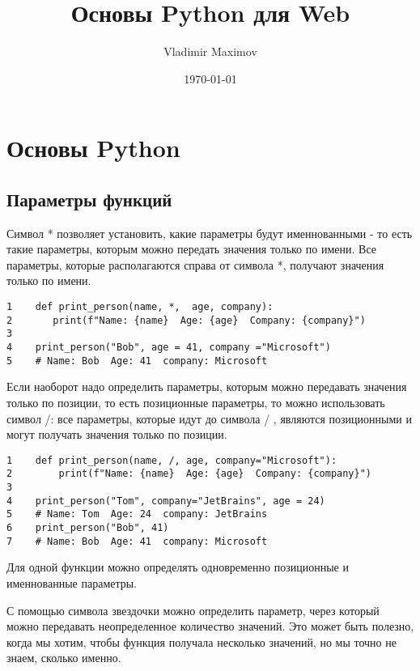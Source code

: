 \documentclass[12pt, a4paper]{article}
\title{Основы Python для Web}
\author{Vladimir Maximov}
\date{\today}
\begin{document}
\maketitle

\section{Основы Python}

\subsection{Параметры функций}

Символ * позволяет установить, какие параметры будут именнованными - то есть такие параметры, которым можно передать значения только по имени. Все параметры, которые располагаются справа от символа *, получают значения только по имени.

\begin{verbatim}
1    def print_person(name, *,  age, company):
2       print(f"Name: {name}  Age: {age}  Company: {company}")
3  
4    print_person("Bob", age = 41, company ="Microsoft")    
5    # Name: Bob  Age: 41  company: Microsoft
\end{verbatim}

Если наоборот надо определить параметры, которым можно передавать значения только по позиции, то есть позиционные параметры, то можно использовать символ /: все параметры, которые идут до символа / , являются позиционными и могут получать значения только по позиции.

\begin{verbatim}
1    def print_person(name, /, age, company="Microsoft"):
2        print(f"Name: {name}  Age: {age}  Company: {company}")
3 
4    print_person("Tom", company="JetBrains", age = 24)     
5    # Name: Tom  Age: 24  company: JetBrains
6    print_person("Bob", 41)                 
7    # Name: Bob  Age: 41  company: Microsoft
\end{verbatim}

Для одной функции можно определять одновременно позиционные и именнованные параметры.

\vspace{1em}

С помощью символа звездочки можно определить параметр, через который можно передавать неопределенное количество значений. Это может быть полезно, когда мы хотим, чтобы функция получала несколько значений, но мы точно не знаем, сколько именно.
\end{document}
